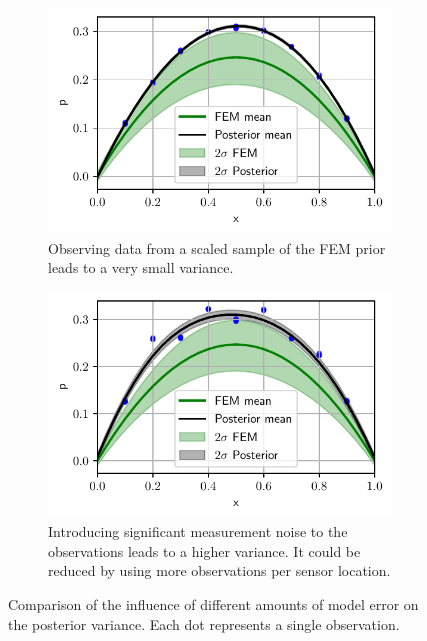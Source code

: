 \documentclass[%
  a4paper,oneside,%
  11pt,%
  smallchapters,
  style=printdev,
  extramargin,
  green,%
  rgb, <cmyk>
  ]{tubsbook}
\begin{document}
\begin{figure}[!ht]

	\begin{subfigure}[t]{.5\textwidth}
	\centering
	\includegraphics[width=1\linewidth]{../../Python/Results/1D/no_d_scaled_40proc.pdf}
	\caption{Observing data from a scaled sample of the FEM prior leads to a very small variance.}
		\label{fig:NoModelError1D}
	\end{subfigure}%
	\begin{subfigure}[t]{.5\textwidth}
	\centering
	\includegraphics[width=1\linewidth]{../../Python/Results/1D/d_scaled40proc.pdf}
\centering
\caption{Introducing significant measurement noise to the observations leads to a higher variance. It could be reduced by using more observations per sensor location.}
\label{fig:ModelError1D}
	\end{subfigure}

\caption{Comparison of the influence of different amounts of model error on the posterior variance. Each dot represents a single observation.}
\label{fig:ModErrNoModErr1D}
\end{figure}
%
\end{document}
